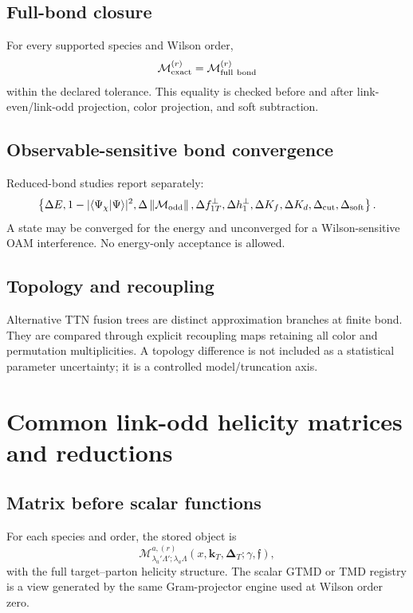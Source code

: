 \documentclass[11pt]{article}
\newcommand{\kT}{\bm{k}_{T}}
\newcommand{\DT}{\bm{\Delta}_{T}}
\newcommand{\cM}{\mathcal M}
\newcommand{\norm}[1]{\left\lVert#1\right\rVert}
\begin{document}
\subsection{Full-bond closure}

For every supported species and Wilson order,
\begin{equation}
 \cM_{\rm exact}^{(r)}
 =\cM_{\rm full\ bond}^{(r)}
 \label{eq:full-bond}
\end{equation}
within the declared tolerance.  This equality is checked before and after
link-even/link-odd projection, color projection, and soft subtraction.

\subsection{Observable-sensitive bond convergence}

Reduced-bond studies report separately:
\begin{equation}
 \left\{
 \Delta E,
 1-|\langle\Psi_\chi|\Psi\rangle|^2,
 \Delta\norm{\cM_{\rm odd}},
 \Delta f_{1T}^{\perp},
 \Delta h_1^\perp,
 \Delta K_f,
 \Delta K_d,
 \Delta_{\rm cut},
 \Delta_{\rm soft}
 \right\}.
 \label{eq:bond-observables}
\end{equation}
A state may be converged for the energy and unconverged for a Wilson-sensitive
OAM interference.  No energy-only acceptance is allowed.

\subsection{Topology and recoupling}

Alternative TTN fusion trees are distinct approximation branches at finite
bond.  They are compared through explicit recoupling maps retaining all color
and permutation multiplicities.  A topology difference is not included as a
statistical parameter uncertainty; it is a controlled model/truncation axis.

\section{Common link-odd helicity matrices and reductions}
\label{sec:projections}

\subsection{Matrix before scalar functions}

For each species and order, the stored object is
\begin{equation}
 \cM^{a,(r)}_{\lambda_a'\Lambda';\lambda_a\Lambda}
 (x,\kT,\DT;\gamma,\mathfrak f),
 \label{eq:stored-matrix}
\end{equation}
with the full target--parton helicity structure.  The scalar GTMD or TMD
registry is a view generated by the same Gram-projector engine used at Wilson
order zero.
\end{document}

